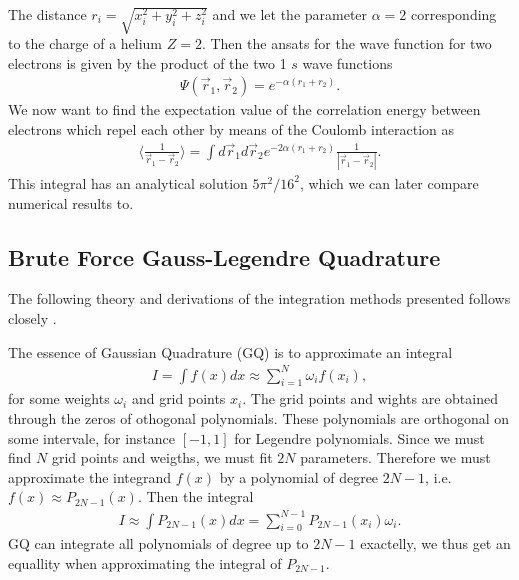 \documentclass[twocolumn]{aastex62}
\begin{document}
The distance $r_i = \sqrt{x_i^2 + y_i^2 + z_i^2}$ and we let the parameter $\alpha = 2$ corresponding to the charge of a helium $Z = 2$. Then the ansats for the wave function for two electrons is given by the product of the two 1 $s$ wave functions 
\begin{align}
	\Psi(\vec{r}_1, \vec{r}_2) = e^{-\alpha(r_1 + r_2)}.
\end{align}
We now want to find the expectation value of the correlation energy between electrons which repel each other by means of the Coulomb interaction as 
\begin{align}
\langle \frac{
1}{\vec{r}_1 - \vec{r}_2}\rangle = \int d\vec{r}_1d\vec{r}_2 e^{-2\alpha(r_1 + r_2)}\frac{1}{|\vec{r}_1 - \vec{r}_2|}.
\label{eq:integral}
\end{align}
This integral has an analytical solution $5\pi^2/16^2$, which we can later compare numerical results to.
\subsection{Brute Force Gauss-Legendre Quadrature}
The following theory and derivations of the integration methods presented follows closely \citep[Ch. 5.3]{jensen:2015}. 

The essence of Gaussian Quadrature (GQ) is to approximate an integral 
\begin{align}
	I = \int f(x) dx \approx \sum^N_{i = 1} \omega_i f(x_i),
	\label{eq:quadrature}
\end{align} 
for some weights $\omega_i$ and grid points $x_i$. The grid points and wights are obtained through the zeros of othogonal polynomials. These polynomials are orthogonal on some intervale, for instance $[-1, 1]$ for Legendre polynomials. Since we must find $N$ grid points and weigths, we must fit $2N$ parameters. Therefore we must approximate the integrand $f(x)$ by a polynomial of degree $2N-1$, i.e. $f(x) \approx P_{2N-1}(x)$. Then the integral 
\begin{align}
	I \approx \int P_{2N-1}(x)dx = \sum^{N-1}_{i=0}P_{2N-1}(x_i) \omega_i.
\end{align} 
GQ can integrate all polynomials of degree up to $2N-1$ exactelly, we thus get an equallity when approximating the integral of $P_{2N-1}$. 
\end{document}
